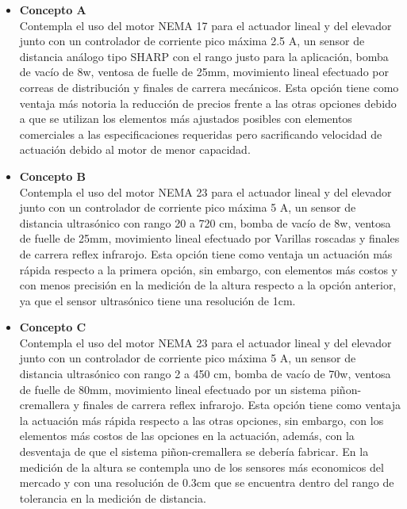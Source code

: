 \begin{itemize}
	\item \textbf{Concepto A}\\
	Contempla el uso del motor NEMA 17 para el actuador lineal y del elevador junto con un controlador de corriente pico máxima 2.5 A, un sensor de distancia análogo tipo SHARP con el rango justo para la aplicación, bomba de vacío de 8w, ventosa de fuelle de 25mm, movimiento lineal efectuado por correas de distribución y finales de carrera mecánicos. Esta opción tiene como ventaja más notoria la reducción de precios frente a las otras opciones debido a que se utilizan los elementos más ajustados posibles con elementos comerciales a las especificaciones requeridas pero sacrificando velocidad de actuación debido al motor de menor capacidad. 
	\item \textbf{Concepto B}\\
	Contempla el uso del motor NEMA 23 para el actuador lineal y del elevador junto con un controlador de corriente pico máxima 5 A, un sensor de distancia ultrasónico con rango 20 a 720 cm, bomba de vacío de 8w, ventosa de fuelle de 25mm, movimiento lineal efectuado por Varillas roscadas y finales de carrera reflex infrarojo. Esta opción tiene como ventaja un actuación más rápida respecto a la primera opción, sin embargo, con elementos más costos y con menos precisión en la medición de la altura respecto a la opción anterior, ya que el sensor ultrasónico tiene una resolución de 1cm. 
	\item \textbf{Concepto C}\\
	Contempla el uso del motor NEMA 23 para el actuador lineal y del elevador junto con un controlador de corriente pico máxima 5 A, un sensor de distancia ultrasónico con rango 2 a 450 cm, bomba de vacío de 70w, ventosa de fuelle de 80mm, movimiento lineal efectuado por un sistema piñon-cremallera y finales de carrera reflex infrarojo. Esta opción tiene como ventaja la actuación más rápida respecto a las otras opciones, sin embargo, con los elementos más costos de las opciones en la actuación, además, con la desventaja de que el sistema piñon-cremallera se debería fabricar. En la medición de la altura se contempla uno de los sensores más economicos del mercado y con una resolución de 0.3cm que se encuentra dentro del rango de tolerancia en la medición de distancia. 
\end{itemize}
